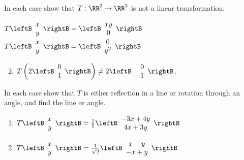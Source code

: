 \begin{multicols}{2}
\begin{ex}
In each case show that $T : \RR^2 \to \RR^2$ is not a linear transformation.
\begin{exenumerate}
\exitem $T \leftB \begin{array}{c}
x \\
y
\end{array} \rightB = \leftB \begin{array}{c}
xy \\
0
\end{array} \rightB$
\exitem $T \leftB \begin{array}{c}
x \\
y
\end{array} \rightB = \leftB \begin{array}{c}
0 \\
y^2
\end{array} \rightB$
\end{exenumerate}
\begin{sol}
\begin{enumerate}[label={\alph*.}]
\setcounter{enumi}{1}
\item $T\left(2 \leftB \begin{array}{c}
0 \\
1
\end{array} \rightB \right) \neq 2 \leftB \begin{array}{r}
0 \\
-1
\end{array} \rightB$.

\end{enumerate}
\end{sol}
\end{ex}

\begin{ex}
In each case show that $T$ is either reflection in a line or rotation through an angle, and find the line or angle.

\begin{enumerate}[label={\alph*.}]
\item $T \leftB \begin{array}{c}
x \\
y
\end{array} \rightB = \frac{1}{5} \leftB \begin{array}{c}
-3x + 4y \\
4x + 3y
\end{array} \rightB$

\item $T \leftB \begin{array}{c}
x \\
y
\end{array} \rightB = \frac{1}{\sqrt{2}} \leftB \begin{array}{c}
x + y \\
-x + y
\end{array} \rightB$


\end{enumerate}
\end{ex}
\end{multicols}
